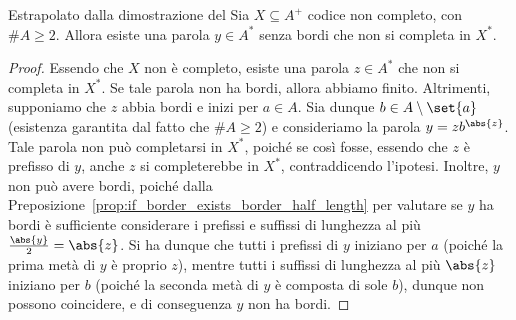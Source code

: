 \begin{lemma}[label=lem:code_not_complete_boredless_word]{\infosymbol{} Estrapolato dalla dimostrazione del }
  Sia \(X \subseteq A^+\) codice non completo, con \(\# A \geq 2\).
  Allora esiste una parola \(y \in A^*\) senza bordi che non si completa in \(X^*\).
\end{lemma}
\begin{proof}
  Essendo che \(X\) non è completo, esiste una parola \(z \in A^*\) che non si completa in \(X^*\).
  Se tale parola non ha bordi, allora abbiamo finito.
  Altrimenti, supponiamo che \(z\) abbia bordi e inizi per \(a \in A\).
  Sia dunque \(b \in A\setminus\set{a}\) (esistenza garantita dal fatto che \(\# A \geq 2\)) e consideriamo la parola \(y = zb^{\abs{z}}\).
  Tale parola non può completarsi in \(X^*\), poiché se così fosse, essendo che \(z\) è prefisso di \(y\), anche \(z\) si completerebbe in \(X^*\), contraddicendo l'ipotesi.
  Inoltre, \(y\) non può avere bordi, poiché dalla Preposizione~\ref{prop:if_border_exists_border_half_length} per valutare se \(y\) ha bordi è sufficiente considerare i prefissi e suffissi di lunghezza al più \(\frac{\abs{y}}{2} = \abs{z}\).
  Si ha dunque che tutti i prefissi di \(y\) iniziano per \(a\) (poiché la prima metà di \(y\) è proprio \(z\)), mentre tutti i suffissi di lunghezza al più \(\abs{z}\) iniziano per \(b\) (poiché la seconda metà di \(y\) è composta di sole \(b\)), dunque non possono coincidere, e di conseguenza \(y\) non ha bordi.
\end{proof}

